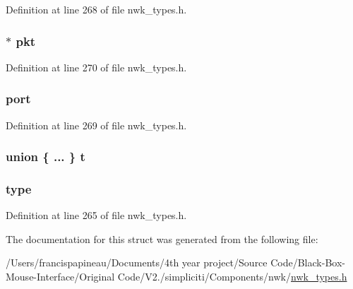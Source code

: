 \-Definition at line 268 of file nwk\-\_\-types.\-h.

\hypertarget{structrcvContext__t_ad103301359467b3f838dbf32b25299a8}{
\subsubsection[{pkt}]{$\ast$ {\bf pkt}}}\label{structrcvContext__t_ad103301359467b3f838dbf32b25299a8}


\-Definition at line 270 of file nwk\-\_\-types.\-h.

\hypertarget{structrcvContext__t_a2fa54f9024782843172506fadbee2ac8}{
\subsubsection[{port}]{ {\bf port}}}\label{structrcvContext__t_a2fa54f9024782843172506fadbee2ac8}


\-Definition at line 269 of file nwk\-\_\-types.\-h.

\hypertarget{structrcvContext__t_a15f73357939d5a39511cda6e8eb5d198}{
\subsubsection[{t}]{\setlength{\rightskip}{0pt plus 5cm}union \{ ... \}   {\bf t}}}\label{structrcvContext__t_a15f73357939d5a39511cda6e8eb5d198}
\hypertarget{structrcvContext__t_a3db35c24c9a9e3bbc08b807e05ad5c58}{
\subsubsection[{type}]{ {\bf type}}}\label{structrcvContext__t_a3db35c24c9a9e3bbc08b807e05ad5c58}


\-Definition at line 265 of file nwk\-\_\-types.\-h.



\-The documentation for this struct was generated from the following file\-:\begin{DoxyCompactItemize}
\item 
/\-Users/francispapineau/\-Documents/4th year project/\-Source Code/\-Black-\/\-Box-\/\-Mouse-\/\-Interface/\-Original Code/\-V2./simpliciti/\-Components/nwk/\hyperlink{nwk__types_8h}{nwk\-\_\-types.\-h}\end{DoxyCompactItemize}
